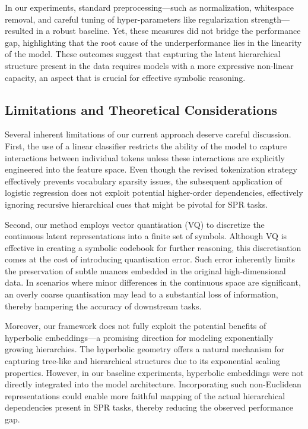 \documentclass{article}
\begin{document}
In our experiments, standard preprocessing—such as normalization, whitespace removal, and careful tuning of hyper-parameters like regularization strength—resulted in a robust baseline. Yet, these measures did not bridge the performance gap, highlighting that the root cause of the underperformance lies in the linearity of the model. These outcomes suggest that capturing the latent hierarchical structure present in the data requires models with a more expressive non-linear capacity, an aspect that is crucial for effective symbolic reasoning.

\subsection{Limitations and Theoretical Considerations}
Several inherent limitations of our current approach deserve careful discussion. First, the use of a linear classifier restricts the ability of the model to capture interactions between individual tokens unless these interactions are explicitly engineered into the feature space. Even though the revised tokenization strategy effectively prevents vocabulary sparsity issues, the subsequent application of logistic regression does not exploit potential higher-order dependencies, effectively ignoring recursive hierarchical cues that might be pivotal for SPR tasks.

Second, our method employs vector quantisation (VQ) to discretize the continuous latent representations into a finite set of symbols. Although VQ is effective in creating a symbolic codebook for further reasoning, this discretisation comes at the cost of introducing quantisation error. Such error inherently limits the preservation of subtle nuances embedded in the original high-dimensional data. In scenarios where minor differences in the continuous space are significant, an overly coarse quantisation may lead to a substantial loss of information, thereby hampering the accuracy of downstream tasks.

Moreover, our framework does not fully exploit the potential benefits of hyperbolic embeddings—a promising direction for modeling exponentially growing hierarchies. The hyperbolic geometry offers a natural mechanism for capturing tree-like and hierarchical structures due to its exponential scaling properties. However, in our baseline experiments, hyperbolic embeddings were not directly integrated into the model architecture. Incorporating such non-Euclidean representations could enable more faithful mapping of the actual hierarchical dependencies present in SPR tasks, thereby reducing the observed performance gap.
\end{document}
